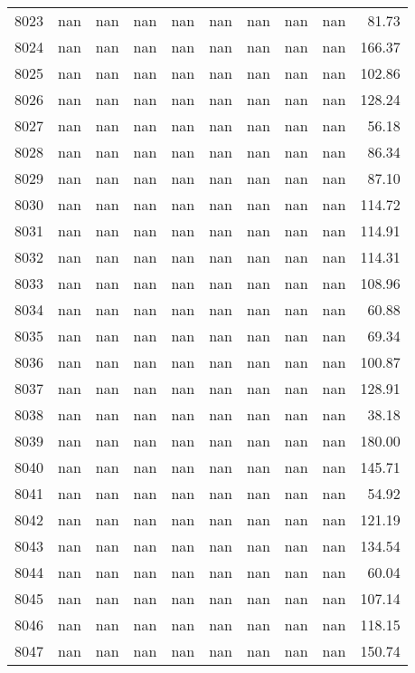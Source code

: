 \begin{tabular}{lrrrrrrrrr}
8023 & nan & nan & nan & nan & nan & nan & nan & nan & 81.73 \\
8024 & nan & nan & nan & nan & nan & nan & nan & nan & 166.37 \\
8025 & nan & nan & nan & nan & nan & nan & nan & nan & 102.86 \\
8026 & nan & nan & nan & nan & nan & nan & nan & nan & 128.24 \\
8027 & nan & nan & nan & nan & nan & nan & nan & nan & 56.18 \\
8028 & nan & nan & nan & nan & nan & nan & nan & nan & 86.34 \\
8029 & nan & nan & nan & nan & nan & nan & nan & nan & 87.10 \\
8030 & nan & nan & nan & nan & nan & nan & nan & nan & 114.72 \\
8031 & nan & nan & nan & nan & nan & nan & nan & nan & 114.91 \\
8032 & nan & nan & nan & nan & nan & nan & nan & nan & 114.31 \\
8033 & nan & nan & nan & nan & nan & nan & nan & nan & 108.96 \\
8034 & nan & nan & nan & nan & nan & nan & nan & nan & 60.88 \\
8035 & nan & nan & nan & nan & nan & nan & nan & nan & 69.34 \\
8036 & nan & nan & nan & nan & nan & nan & nan & nan & 100.87 \\
8037 & nan & nan & nan & nan & nan & nan & nan & nan & 128.91 \\
8038 & nan & nan & nan & nan & nan & nan & nan & nan & 38.18 \\
8039 & nan & nan & nan & nan & nan & nan & nan & nan & 180.00 \\
8040 & nan & nan & nan & nan & nan & nan & nan & nan & 145.71 \\
8041 & nan & nan & nan & nan & nan & nan & nan & nan & 54.92 \\
8042 & nan & nan & nan & nan & nan & nan & nan & nan & 121.19 \\
8043 & nan & nan & nan & nan & nan & nan & nan & nan & 134.54 \\
8044 & nan & nan & nan & nan & nan & nan & nan & nan & 60.04 \\
8045 & nan & nan & nan & nan & nan & nan & nan & nan & 107.14 \\
8046 & nan & nan & nan & nan & nan & nan & nan & nan & 118.15 \\
8047 & nan & nan & nan & nan & nan & nan & nan & nan & 150.74 \\

\end{tabular}
